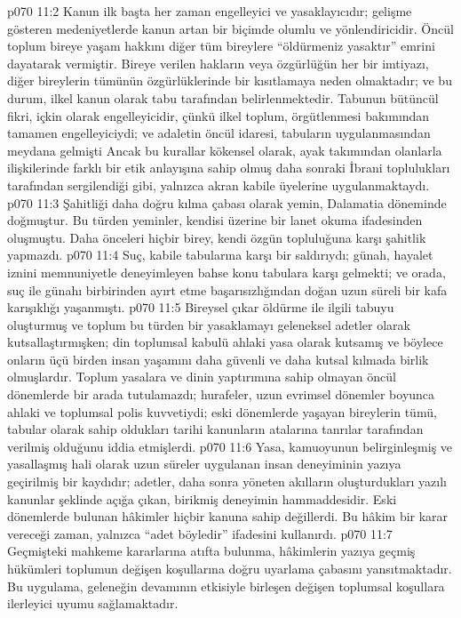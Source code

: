 \vs p070 11:2 Kanun ilk başta her zaman engelleyici ve yasaklayıcıdır; gelişme gösteren medeniyetlerde kanun artan bir biçimde olumlu ve yönlendiricidir. Öncül toplum bireye yaşam hakkını diğer tüm bireylere “öldürmeniz yasaktır” emrini dayatarak vermiştir. Bireye verilen hakların veya özgürlüğün her bir imtiyazı, diğer bireylerin tümünün özgürlüklerinde bir kısıtlamaya neden olmaktadır; ve bu durum, ilkel kanun olarak tabu tarafından belirlenmektedir. Tabunun bütüncül fikri, içkin olarak engelleyicidir, çünkü ilkel toplum, örgütlenmesi bakımından tamamen engelleyiciydi; ve adaletin öncül idaresi, tabuların uygulanmasından meydana gelmişti Ancak bu kurallar kökensel olarak, ayak takımından olanlarla ilişkilerinde farklı bir etik anlayışına sahip olmuş daha sonraki İbrani toplulukları tarafından sergilendiği gibi, yalnızca akran kabile üyelerine uygulanmaktaydı.
\vs p070 11:3 Şahitliği daha doğru kılma çabası olarak yemin, Dalamatia döneminde doğmuştur. Bu türden yeminler, kendisi üzerine bir lanet okuma ifadesinden oluşmuştu. Daha önceleri hiçbir birey, kendi özgün topluluğuna karşı şahitlik yapmazdı.
\vs p070 11:4 Suç, kabile tabularına karşı bir saldırıydı; günah, hayalet iznini memnuniyetle deneyimleyen bahse konu tabulara karşı gelmekti; ve orada, suç ile günahı birbirinden ayırt etme başarısızlığından doğan uzun süreli bir kafa karışıklığı yaşanmıştı.
\vs p070 11:5 Bireysel çıkar öldürme ile ilgili tabuyu oluşturmuş ve toplum bu türden bir yasaklamayı geleneksel adetler olarak kutsallaştırmışken; din toplumsal kabulü ahlaki yasa olarak kutsamış ve böylece onların üçü birden insan yaşamını daha güvenli ve daha kutsal kılmada birlik olmuşlardır. Toplum yasalara ve dinin yaptırımına sahip olmayan öncül dönemlerde bir arada tutulamazdı; hurafeler, uzun evrimsel dönemler boyunca ahlaki ve toplumsal polis kuvvetiydi; eski dönemlerde yaşayan bireylerin tümü, tabular olarak sahip oldukları tarihi kanunların atalarına tanrılar tarafından verilmiş olduğunu iddia etmişlerdi.
\vs p070 11:6 Yasa, kamuoyunun belirginleşmiş ve yasallaşmış hali olarak uzun süreler uygulanan insan deneyiminin yazıya geçirilmiş bir kaydıdır; adetler, daha sonra yöneten akılların oluşturdukları yazılı kanunlar şeklinde açığa çıkan, birikmiş deneyimin hammaddesidir. Eski dönemlerde bulunan hâkimler hiçbir kanuna sahip değillerdi. Bu hâkim bir karar vereceği zaman, yalnızca “adet böyledir” ifadesini kullanırdı.
\vs p070 11:7 Geçmişteki mahkeme kararlarına atıfta bulunma, hâkimlerin yazıya geçmiş hükümleri toplumun değişen koşullarına doğru uyarlama çabasını yansıtmaktadır. Bu uygulama, geleneğin devamının etkisiyle birleşen değişen toplumsal koşullara ilerleyici uyumu sağlamaktadır.
